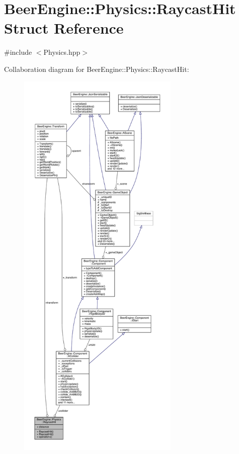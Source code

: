 \hypertarget{struct_beer_engine_1_1_physics_1_1_raycast_hit}{}\section{Beer\+Engine\+:\+:Physics\+:\+:Raycast\+Hit Struct Reference}
\label{struct_beer_engine_1_1_physics_1_1_raycast_hit}


{\ttfamily \#include $<$Physics.\+hpp$>$}



Collaboration diagram for Beer\+Engine\+:\+:Physics\+:\+:Raycast\+Hit\+:
\nopagebreak
\begin{figure}[H]
\begin{center}
\leavevmode
\includegraphics[height=550pt]{struct_beer_engine_1_1_physics_1_1_raycast_hit__coll__graph}
\end{center}
\end{figure}
